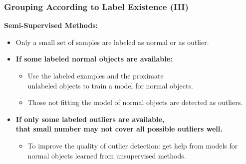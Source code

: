 \begin{frame}
	\frametitle{Grouping According to Label Existence (III)}
	\textcolor{faugray}{\textbf{Semi-Supervised Methods:}}
	\begin{itemize}
		\item Only a small set of samples are labeled as normal or as outlier.
		\item \textbf{If some {\color{airforceblue}labeled normal objects} are available:}
		      \begin{itemize}
			      \item Use the labeled examples and the proximate \\
			            unlabeled objects to train a model for normal objects.
			      \item Those not fitting the model of normal objects are detected as outliers.
		      \end{itemize}
		\item \textbf{If only some {\color{airforceblue}labeled outliers} are available, \\ that small number may not cover all possible outliers well.}
		      \begin{itemize}
			      \item To improve the quality of outlier detection: get help from models for normal objects learned from unsupervised methods.
		      \end{itemize}
	\end{itemize}
\end{frame}


